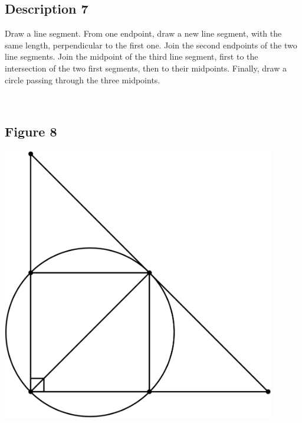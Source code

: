 \documentclass[12pt,a4paper,article,english,firamath]{nsi}
\begin{document}
\maketitle

\subsection*{Description 7}
{\brettley 

Draw a line segment. From one endpoint, draw a new line segment, with the same length, perpendicular to the first one.
Join the second endpoints of the two line segments. Join the midpoint of the third line segment, first to the
intersection of the two first segments, then to their midpoints.  Finally, draw a circle passing through the three
midpoints.}\\[1em]



\subsection*{Figure 8}
\begin{center}
    \includegraphics[height=12cm]{img/fig08.png}
\end{center}
\end{document}
